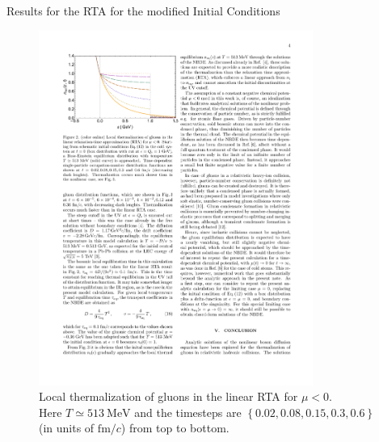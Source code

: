 \begin{frame}{Results for the RTA for the modified Initial Conditions}
\begin{figure}[H]
\centering
\includegraphics[width=0.8\textwidth]{figures/rta_full}
\caption{Local thermalization of gluons in the linear RTA for $\mu<0$. \cite{Wolschin2020_1} \\ 
Here $T \simeq 513\ \mathrm{MeV}$ and the timesteps are $\left\{0.02, 0.08, 0.15,0.3,0.6\right\}$ (in units of $\mathrm{fm}/c$) from top to bottom.}
\end{figure}
\end{frame}
